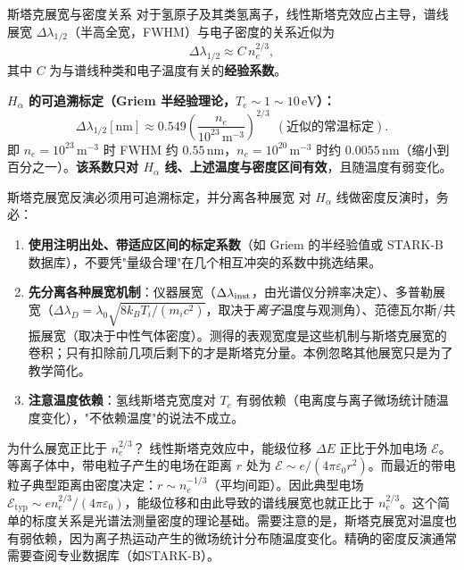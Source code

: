 \documentclass[12pt,a4paper,openany,oneside]{book}
\newcommand{\eps}{\varepsilon}
\begin{document}
\begin{definition}{斯塔克展宽与密度关系}{}{}
对于氢原子及其类氢离子，线性斯塔克效应占主导，谱线展宽 $\Delta\lambda_{1/2}$（半高全宽，FWHM）与电子密度的关系近似为
\begin{equation}
\Delta\lambda_{1/2} \approx C\,n_e^{2/3},
\label{eq:stark-broadening}
\end{equation}
其中 $C$ 为与谱线种类和电子温度有关的\textbf{经验系数}。

\textbf{$H_\alpha$ 的可追溯标定（Griem 半经验理论，$T_e\sim1\sim10\,\mathrm{eV}$）：}
\[
\Delta\lambda_{1/2}[\mathrm{nm}]
\approx 0.549\left(\frac{n_e}{10^{23}\,\mathrm{m^{-3}}}\right)^{2/3}
\ \ (\text{近似的常温标定}).
\]
即 $n_e = 10^{23}\,\mathrm{m^{-3}}$ 时 FWHM 约 $0.55\,\mathrm{nm}$，$n_e = 10^{20}\,\mathrm{m^{-3}}$ 时约 $0.0055\,\mathrm{nm}$（缩小到百分之一）。\textbf{该系数只对 $H_\alpha$ 线、上述温度与密度区间有效}，且随温度有弱变化。
\end{definition}

\begin{warning}{斯塔克展宽反演必须用可追溯标定，并分离各种展宽}{}
对 $H_\alpha$ 线做密度反演时，务必：
\begin{enumerate}
    \item \textbf{使用注明出处、带适应区间的标定系数}（如 Griem 的半经验值或 STARK-B 数据库），不要凭"量级合理"在几个相互冲突的系数中挑选结果。
    \item \textbf{先分离各种展宽机制}：仪器展宽（$\Delta\lambda_{\rm inst}$，由光谱仪分辨率决定）、多普勒展宽（$\Delta\lambda_D = \lambda_0\sqrt{8k_BT_i/(m_ic^2)}$，取决于\emph{离子}温度与观测角）、范德瓦尔斯/共振展宽（取决于中性气体密度）。测得的表观宽度是这些机制与斯塔克展宽的卷积；只有扣除前几项后剩下的才是斯塔克分量。本例忽略其他展宽只是为了教学简化。
    \item \textbf{注意温度依赖}：氢线斯塔克宽度对 $T_e$ 有弱依赖（电离度与离子微场统计随温度变化），"不依赖温度"的说法不成立。
\end{enumerate}
\end{warning}

\begin{insight}{为什么展宽正比于 $n_e^{2/3}$？}{}
线性斯塔克效应中，能级位移 $\Delta E$ 正比于外加电场 $\mathcal{E}$。等离子体中，带电粒子产生的电场在距离 $r$ 处为 $\mathcal{E} \sim e/(4\pi\eps_0 r^2)$。而最近的带电粒子典型距离由密度决定：$r \sim n_e^{-1/3}$（平均间距）。因此典型电场 $\mathcal{E}_{\mathrm{typ}} \sim e n_e^{2/3}/(4\pi\eps_0)$，能级位移和由此导致的谱线展宽也就正比于 $n_e^{2/3}$。这个简单的标度关系是光谱法测量密度的理论基础。需要注意的是，斯塔克展宽对温度也有弱依赖，因为离子热运动产生的微场统计分布随温度变化。精确的密度反演通常需要查阅专业数据库（如STARK-B）。
\end{insight}
\end{document}
